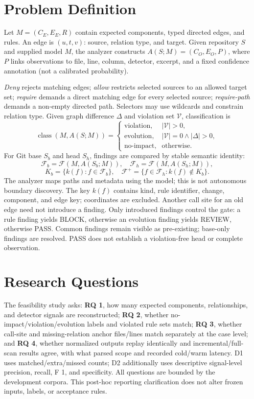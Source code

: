 \section{Problem Definition}
Let $M=(C_E,E_E,R)$ contain expected components, typed directed edges, and rules. An edge is $(u,t,v)$: source, relation type, and target. Given repository $S$ and supplied model $M$, the analyzer constructs $A(S;M)=(C_O,E_O,P)$, where $P$ links observations to file, line, column, detector, excerpt, and a fixed confidence annotation (not a calibrated probability).

\emph{Deny} rejects matching edges; \emph{allow} restricts selected sources to an allowed target set; \emph{require} demands a direct matching edge for every selected source; \emph{require-path} demands a non-empty directed path. Selectors may use wildcards and constrain relation type. Given graph difference $\Delta$ and violation set $\mathcal V$, classification is
\[
\operatorname{class}(M,A(S;M))=
\begin{cases}
\text{violation},&|\mathcal V|>0,\\
\text{evolution},&|\mathcal V|=0\land|\Delta|>0,\\
\text{no-impact},&\text{otherwise.}
\end{cases}
\]
For Git base $S_b$ and head $S_h$, findings are compared by stable semantic identity:
\[
\mathcal F_b=\mathcal F(M,A(S_b;M)),\quad
\mathcal F_h=\mathcal F(M,A(S_h;M)),
\]
\[
K_b=\{k(f):f\in\mathcal F_b\},\quad
\mathcal F^+=\{f\in\mathcal F_h:k(f)\notin K_b\}.
\]
The analyzer maps paths and metadata using the model; this is not autonomous boundary discovery. The key $k(f)$ contains kind, rule identifier, change, component, and edge key; coordinates are excluded. Another call site for an old edge need not introduce a finding. Only introduced findings control the gate: a rule finding yields BLOCK, otherwise an evolution finding yields REVIEW, otherwise PASS. Common findings remain visible as pre-existing; base-only findings are resolved. PASS does not establish a violation-free head or complete observation.

\section{Research Questions}
The feasibility study asks: \textbf{RQ 1}, how many expected components, relationships, and detector signals are reconstructed; \textbf{RQ 2}, whether no-impact/violation/evolution labels and violated rule sets match; \textbf{RQ 3}, whether call-site and missing-relation anchor files/lines match separately at the case level; and \textbf{RQ 4}, whether normalized outputs replay identically and incremental/full-scan results agree, with what parsed scope and recorded cold/warm latency. D1 uses matched/extra/missed counts; D2 additionally uses descriptive signal-level precision, recall, F 1, and specificity. All questions are bounded by the development corpora. This post-hoc reporting clarification does not alter frozen inputs, labels, or acceptance rules.

